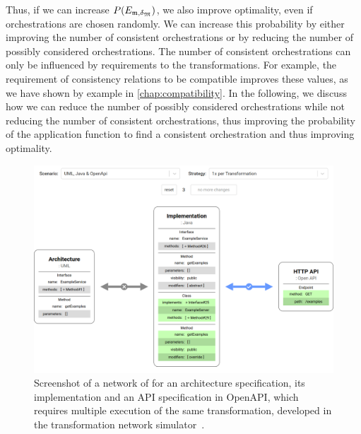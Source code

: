 Thus, if we can increase $P(E_{\modeltuple{m},\changetuple{\metamodeltuple{M}}})$, we also improve optimality, even if orchestrations are chosen randomly.
We can increase this probability by either improving the number of consistent orchestrations or by reducing the number of possibly considered orchestrations.
The number of consistent orchestrations can only be influenced by requirements to the transformations.
For example, the requirement of consistency relations to be compatible improves these values, as we have shown by example in \autoref{chap:compatibility}.
In the following, we discuss how we can reduce the number of possibly considered orchestrations while not reducing the number of consistent orchestrations, thus improving the probability of the application function to find a consistent orchestration and thus improving optimality.

\begin{figure}
    \centering
    \includegraphics[width=\textwidth]{figures/correctness/orchestration/simulator_screenshot.png}
    \caption[Screenshot of the transformation network simulator]{Screenshot of a network of for an architecture specification, its implementation and an API specification in OpenAPI, which requires multiple execution of the same transformation, developed in the transformation network simulator~\cite{orchestrationSimulator}.}
    \label{fig:orchestration:simulator}
\end{figure}

